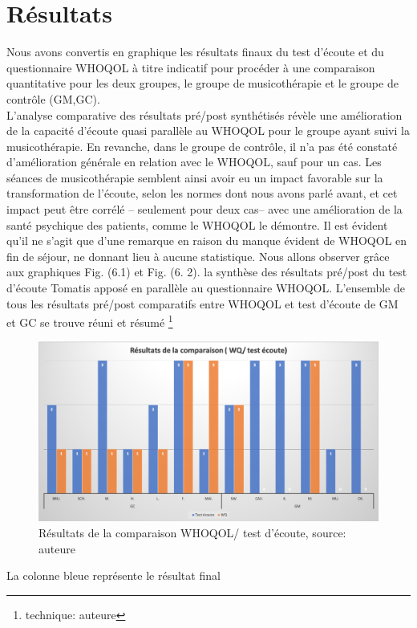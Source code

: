    \chapter{Résultats}
   Nous avons convertis en graphique les résultats finaux du test d'écoute et du questionnaire  WHOQOL  
   à titre indicatif pour 
   procéder à une comparaison quantitative pour les deux groupes, le groupe de 
   musicothérapie et le groupe de contrôle (GM,GC).
   \\
   L'analyse comparative des résultats pré/post synthétisés révèle une amélioration 
   de la capacité d'écoute quasi parallèle au WHOQOL pour le groupe ayant suivi la musicothérapie. En 
   revanche, dans le groupe de contrôle, il n'a pas été constaté d'amélioration générale en relation avec le 
   WHOQOL, sauf pour un cas. Les 
   séances de  
   musicothérapie semblent  ainsi avoir 
   eu un impact favorable sur la transformation de l'écoute, selon les normes dont nous avons parlé 
   avant, et cet impact peut être corrélé -- seulement  pour  deux cas-- avec une amélioration de la 
   santé 
   psychique des 
   patients, comme le WHOQOL le démontre. Il est évident qu'il ne s'agit que d'une remarque en raison du 
   manque évident de WHOQOL en fin de séjour, ne donnant  lieu à aucune statistique. Nous allons 
   observer 
   grâce aux
   graphiques Fig. (6.1) et Fig. (6. 2). la synthèse des résultats pré/post du test d'écoute Tomatis apposé 
   en 
   parallèle au questionnaire WHOQOL.
     L'ensemble de tous les résultats pré/post comparatifs entre WHOQOL et test 
     d'écoute de  
     GM et GC se trouve réuni et résumé \footnote{technique: auteure}
    \begin{figure}
    	\centering
    	\includegraphics[width=0.7\columnwidth]{images/graphiques/comparatifWQecoute.png}
    	\caption[Comparatif résultats pré/post]{Résultats de la comparaison WHOQOL/ test 
    	d'écoute, source: auteure}
    \end{figure}
    \clearpage
    La colonne bleue représente le résultat final 
